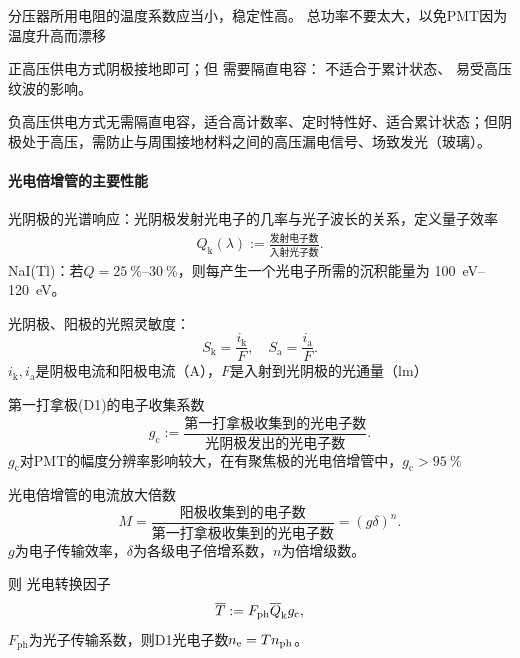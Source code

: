 分压器所用电阻的温度系数应当小，稳定性高。
总功率不要太大，以免PMT因为温度升高而漂移

正高压供电方式阴极接地即可；但
需要隔直电容：
不适合于累计状态、
易受高压纹波的影响。

负高压供电方式无需隔直电容，适合高计数率、定时特性好、适合累计状态；但阴极处于高压，需防止与周围接地材料之间的高压漏电信号、场致发光（玻璃）。
\paragraph{光电倍增管的主要性能}
\begin{compactitem}
	\item 光阴极的光谱响应：光阴极发射光电子的几率与光子波长的关系，定义量子效率
	\begin{align}
		Q_\mathrm k(\lambda) := \frac{\text{发射电子数}}{\text{入射光子数}}.
	\end{align}
	NaI(Tl)：若$Q = \qtyrange{25}{30}{\percent}$，则每产生一个光电子所需的沉积能量为 \qtyrange{100}{120}{eV}。
	\item 光阴极、阳极的光照灵敏度：
	\begin{equation}\label{eq:nrd-phototube-luminous-sensitivity}
		S_\mathrm k = \frac{i_\mathrm k}F,\quad S_\mathrm a = \frac{i_\mathrm a}F.
	\end{equation}
	$i_\mathrm k,i_\mathrm a$是阴极电流和阳极电流（\unit{A}），$F$是入射到光阴极的光通量（\unit{lm}）
	\item 第一打拿极(D1)的电子收集系数
	\begin{equation}\label{eq:nrd-dynode-collection-efficiency}
		g_\mathrm c := \frac{\text{第一打拿极收集到的光电子数}}{\text{光阴极发出的光电子数}}.
	\end{equation}
	$g_\mathrm c$对PMT的幅度分辨率影响较大，在有聚焦极的光电倍增管中，$g_\mathrm c > \qty{95}{\percent}$
	\item 光电倍增管的电流放大倍数
	\begin{equation}\label{eq:nrd-photomultiplier-gain}
		M = \frac{\text{阳极收集到的电子数}}{\text{第一打拿极收集到的光电子数}} = (g\delta)^n.
	\end{equation}
	$g$为电子传输效率，$\delta$为各级电子倍增系数，$n$为倍增级数。
\end{compactitem}
则%
光电转换因子
\begin{equation}\label{eq:nrd-photoconversion-factor}
	\overline{T} := F_{\mathrm{ph}}\overline{Q}_\mathrm kg_\mathrm c,
\end{equation}
$F_{\mathrm{ph}}$为光子传输系数，则D1光电子数$n_{\mathrm{e}} = Tn_{\mathrm{ph}}$。

